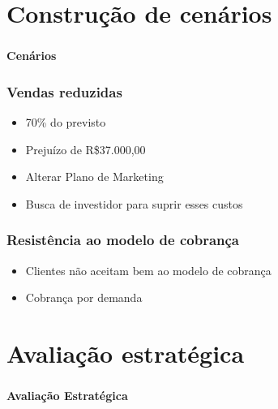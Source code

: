 \documentclass{beamer}
\begin{document}
\section{Construção de cenários}
\begin{frame}
  \frametitle{}
  \framesubtitle{}

  \begin{center}
    {\huge\textbf{Cenários}}
  \end{center}
\end{frame}

\begin{frame}
  \frametitle{Vendas reduzidas}

  \begin{itemize}
    \item 70\% do previsto
    \item Prejuízo de R\$37.000,00
    \item Alterar Plano de Marketing
    \item Busca de investidor para suprir esses custos
  \end{itemize}

\end{frame}

\begin{frame}
  \frametitle{Resistência ao modelo de cobrança}

  \begin{itemize}
    \item Clientes não aceitam bem ao modelo de cobrança
    \item Cobrança por demanda
  \end{itemize}

\end{frame}

\section{Avaliação estratégica}
\begin{frame}
  \frametitle{}
  \framesubtitle{}

  \begin{center}
    {\huge\textbf{Avaliação Estratégica}}
  \end{center}
\end{frame}
\end{document}
